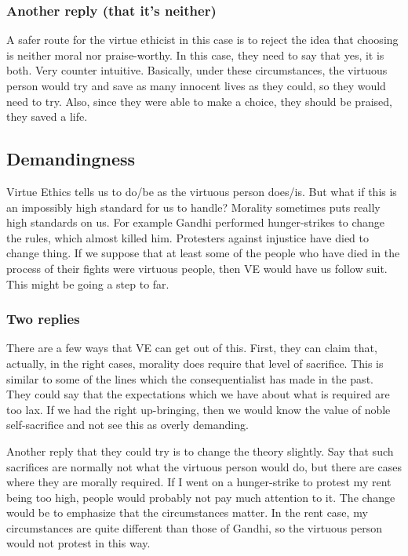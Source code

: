 \subsubsection{Another reply (that it’s neither)}

A safer route for the virtue ethicist in this case is to reject the idea that choosing is neither moral nor praise-worthy. In this case, they need to say that yes, it is both. Very counter intuitive. Basically, under these circumstances, the virtuous person would try and save as many innocent lives as they could, so they would need to try. Also, since they were able to make a choice, they should be praised, they saved a life.
\subsection{Demandingness}

Virtue Ethics tells us to do/be as the virtuous person does/is. But what if this is an impossibly high standard for us to handle? Morality sometimes puts really high standards on us. For example Gandhi performed hunger-strikes to change the rules, which almost killed him. Protesters against injustice have died to change thing. If we suppose that at least some of the people who have died in the process of their fights were virtuous people, then VE would have us follow suit. This might be going a step to far.
\subsubsection{Two replies}

There are a few ways that VE can get out of this. First, they can claim that, actually, in the right cases, morality does require that level of sacrifice. This is similar to some of the lines which the consequentialist has made in the past. They could say that the expectations which we have about what is required are too lax. If we had the right up-bringing, then we would know the value of noble self-sacrifice and not see this as overly demanding.

Another reply that they could try is to change the theory slightly. Say that such sacrifices are normally not what the virtuous person would do, but there are cases where they are morally required. If I went on a hunger-strike to protest my rent being too high, people would probably not pay much attention to it. The change would be to emphasize that the circumstances matter. In the rent case, my circumstances are quite different than those of Gandhi, so the virtuous person would not protest in this way.
